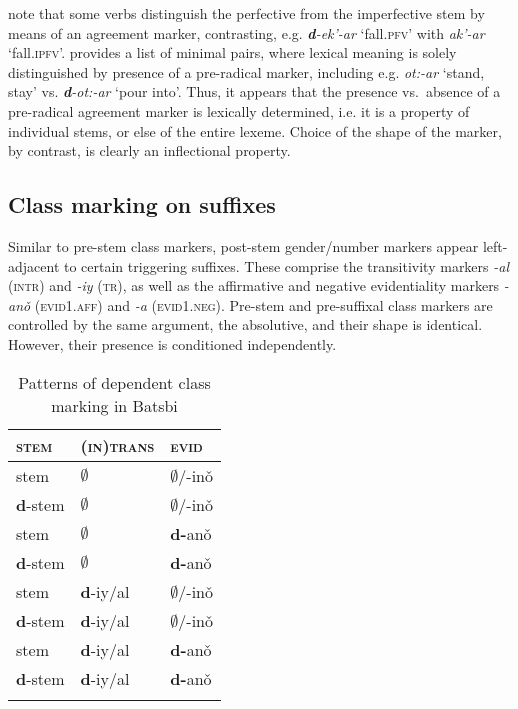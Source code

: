\documentclass[output=paper]{langsci/langscibook}
\begin{document}
\citet{holisky:gagua:94} note that some verbs distinguish the perfective
from the imperfective stem by means of an agreement marker,
contrasting, e.g. \textit{\textbf{d}-ek'-ar} `fall.\textsc{pfv}' with
\textit{ak'-ar} `fall.\textsc{ipfv}'. \citet{Harris09} provides a list
of minimal pairs, where lexical meaning is solely distinguished by
presence of a pre-radical marker, including e.g. \textit{ot:-ar}
`stand, stay' vs. \textit{\textbf{d}-ot:-ar} `pour into'.  Thus, it
appears that the presence vs.\ absence of a pre-radical agreement marker
is lexically determined, i.e. it is a property of individual stems, or
else of the entire lexeme. Choice of the shape of the marker, by contrast,
is clearly an inflectional property.

\subsection{Class marking on suffixes}
\label{sec:Data:Suffixes}

Similar to pre-stem class markers, post-stem gender/number markers
appear left-adjacent to certain triggering suffixes. These comprise
the transitivity markers \textit{-al} (\textsc{intr}) and \textit{-iy}
(\textsc{tr}), as well as the affirmative and negative evidentiality
markers \textit{-anǒ} (\textsc{evid1.aff}) and \textit{-a}
(\textsc{evid1.neg}). Pre-stem and pre-suffixal class markers are
controlled by the same argument, the absolutive, and their shape is
identical. However, their presence is conditioned
independently.  

\begin{table}[htb]
  \centering
  \begin{tabular}[t]{lll}
    \lsptoprule
    \textsc{stem} & \textsc{(in)trans} & \textsc{evid}\\
  \midrule
  stem & $\emptyset$ & $\emptyset$/-inǒ\\
  \textbf{d}-stem & $\emptyset$ & $\emptyset$/-inǒ\\
  stem & $\emptyset$ & \textbf{d-}anǒ\\
  \textbf{d}-stem & $\emptyset$ & \textbf{d-}anǒ\\
  stem & \textbf{d}-iy/al & $\emptyset$/-inǒ\\
      \textbf{d}-stem & \textbf{d}-iy/al & $\emptyset$/-inǒ\\
  stem & \textbf{d}-iy/al & \textbf{d-}anǒ\\
  \textbf{d}-stem & \textbf{d}-iy/al & \textbf{d-}anǒ\\
    \lspbottomrule
\end{tabular}

\caption{Patterns of dependent class marking in Batsbi \citep{Harris09}}
\label{tab:MarkingPatterns}
\end{table}
\end{document}
